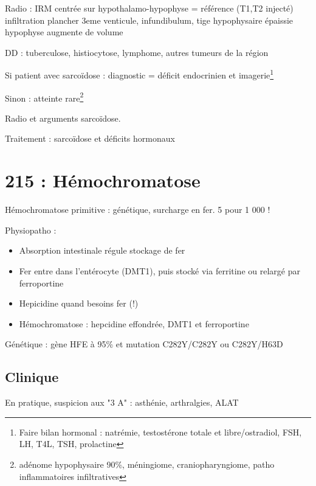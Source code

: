 \documentclass[11pt]{article}
\begin{document}
Radio : IRM centrée sur hypothalamo-hypophyse = référence (T1,T2 injecté) \thus
infiltration plancher 3eme venticule, infundibulum, tige hypophysaire épaissie
\textpm{} hypophyse augmente de volume

DD : tuberculose, histiocytose, lymphome, autres tumeurs de la région 

Si patient avec sarcoïdose : diagnostic = déficit endocrinien et imagerie\footnote{Faire bilan hormonal : natrémie, testostérone totale et libre/ostradiol,
FSH, LH, T4L, TSH, prolactine}

Sinon : atteinte rare\footnote{adénome hypophysaire 90\%, méningiome, craniopharyngiome, patho
inflammatoires infiltratives}

Radio et arguments sarcoïdose.

Traitement : sarcoïdose et déficits hormonaux

\section{215 : Hémochromatose}
\label{sec:orgb481e32}
Hémochromatose primitive : génétique, surcharge en fer. 5 pour 1 000 !

Physiopatho : 
\begin{itemize}
\item Absorption intestinale régule stockage de fer
\item Fer entre dans l'entérocyte (DMT1), puis stocké via ferritine ou relargé par ferroportine
\item Hepicidine \dec quand besoins fer \inc (!)
\item Hémochromatose : hepcidine effondrée, DMT1 et ferroportine \inc
\end{itemize}

Génétique : gène HFE à 95\% et mutation C282Y/C282Y ou C282Y/H63D

\subsection{Clinique}
\label{sec:org7f9c06f}
En pratique, suspicion aux "3 A" : asthénie, arthralgies, \inc ALAT
\end{document}
